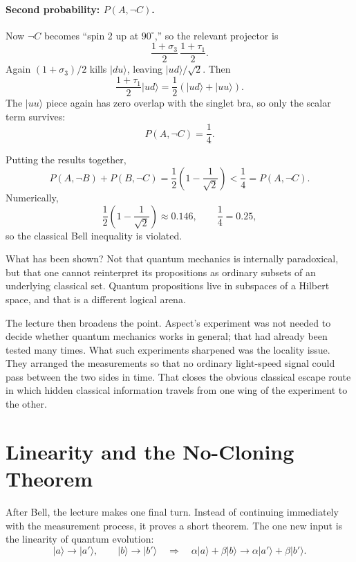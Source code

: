 \paragraph{Second probability: \(P(A,\neg C)\).}
Now \(\neg C\) becomes ``spin 2 up at \(90^\circ\),''
so the relevant projector is
\[
\frac{1+\sigma_3}{2}\,\frac{1+\tau_1}{2}.
\]
Again \((1+\sigma_3)/2\) kills \(|du\rangle\), leaving \(|ud\rangle/\sqrt{2}\). Then
\[
\frac{1+\tau_1}{2}|ud\rangle
=
\frac{1}{2}(|ud\rangle+|uu\rangle).
\]
The \(|uu\rangle\) piece again has zero overlap with the singlet bra, so only the scalar term survives:
\begin{equation}
P(A,\neg C)=\frac{1}{4}.
\end{equation}

Putting the results together,
\begin{equation}
P(A,\neg B)+P(B,\neg C)
=
\frac{1}{2}\left(1-\frac{1}{\sqrt{2}}\right)
<
\frac{1}{4}
=
P(A,\neg C).
\end{equation}
Numerically,
\[
\frac{1}{2}\left(1-\frac{1}{\sqrt{2}}\right)\approx 0.146,
\qquad
\frac{1}{4}=0.25,
\]
so the classical Bell inequality is violated.

What has been shown? Not that quantum mechanics is internally paradoxical, but that one cannot reinterpret its propositions as ordinary subsets of an underlying classical set. Quantum propositions live in subspaces of a Hilbert space, and that is a different logical arena.

The lecture then broadens the point. Aspect's experiment was not needed to decide whether quantum mechanics works in general; that had already been tested many times. What such experiments sharpened was the locality issue. They arranged the measurements so that no ordinary light-speed signal could pass between the two sides in time. That closes the obvious classical escape route in which hidden classical information travels from one wing of the experiment to the other.

\section{Linearity and the No-Cloning Theorem}

After Bell, the lecture makes one final turn. Instead of continuing immediately with the measurement process, it proves a short theorem. The one new input is the linearity of quantum evolution:
\begin{equation}
|a\rangle\to |a'\rangle,
\qquad
|b\rangle\to |b'\rangle
\quad \Longrightarrow \quad
\alpha |a\rangle+\beta |b\rangle
\to
\alpha |a'\rangle+\beta |b'\rangle.
\end{equation}

